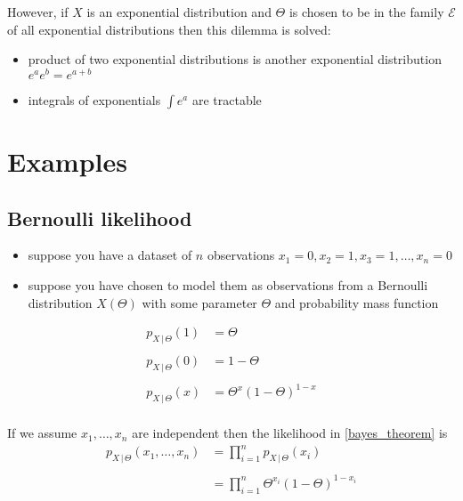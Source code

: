 \documentclass[14pt, reqno]{amsart}
\theoremstyle{definition}
\begin{document}
However, if $X$ is an exponential distribution and $\Theta$ is chosen to be in the family $\mathcal{E}$ of all exponential distributions then this dilemma is solved:
\begin{itemize} 
\item product of two exponential distributions is another exponential distribution $e^a e^b = e^{a + b}$
\item integrals of exponentials $\int e^a$ are tractable
\end{itemize}
\vfill
\pagebreak

\section{Examples}

\vspace{20pt}
\subsection{Bernoulli likelihood}
\begin{itemize}
\item suppose you have a dataset of $n$ observations $x_1 = 0, x_2 = 1, x_3 = 1, \dots, x_n = 0$
\item suppose you have chosen to model them as observations from a Bernoulli distribution $X(\Theta)$ with some parameter $\Theta$ and probability mass function
\end{itemize}
\begin{equation}\label{bernoulli_pmf}
\begin{split}
p_{X \,|\, \Theta}(1) & = \Theta \\
\\
p_{X \,|\, \Theta}(0) & = 1 - \Theta \\
\\
p_{X \,|\, \Theta}(x) & = \Theta^x (1 - \Theta)^{1 - x} \\
\end{split}
\end{equation}
\vspace{20pt}

If we assume $x_1, \dots, x_n$ are independent then the likelihood in \eqref{bayes_theorem} is
\begin{equation}
\begin{split}
p_{X \,|\, \Theta}(x_1, \dots, x_n) & = \prod \limits _{i=1}^n p_{X \,|\, \Theta}(x_i) \\
\\
 & = \prod \limits _{i=1}^n \Theta^{x_i} (1 - \Theta)^{1 - x_i} \\
\end{split}
\end{equation}
\vfill
\pagebreak
\end{document}
